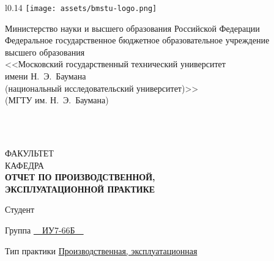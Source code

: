 \begin{titlepage}
	{
		\centering
		\begin{wrapfigure}[7]{l}{0.14\linewidth}
			\vspace{3.4mm}
			\hspace{-8mm}
			\texttt{[image: assets/bmstu-logo.png]}
		\end{wrapfigure}
		
		{
			\singlespacing \small
			Министерство науки и высшего образования Российской Федерации \\
			Федеральное государственное бюджетное образовательное учреждение \\
			высшего образования \\
			<<Московский государственный технический университет \\
			имени Н.~Э.~Баумана \\
			(национальный исследовательский университет)>> \\
			(МГТУ им. Н.~Э.~Баумана) \\
		}
		
		\vspace{-4.2mm}
		\vhrulefill{0.7mm} \\
		\vspace{-7mm}
		\vhrulefill{0.2mm} \\
		\vspace{2.8mm}
		
		\small
		ФАКУЛЬТЕТ  \\
		\vspace{3.3mm}
		КАФЕДРА  \\
		
		\vspace{15.8mm}
		\Large \bfseries
		ОТЧЕТ ПО ПРОИЗВОДСТВЕННОЙ,\\
		ЭКСПЛУАТАЦИОННОЙ ПРАКТИКЕ \\
	}
	
	\vspace{10.8mm}
	
	Студент \uline{\hfill{}\hfill}
	
	
	\vspace{3.3mm}
	
	Группа \uline{~~ИУ7-66Б~~}
	
	
	\vspace{1.3mm}
	
	
	Тип практики \uline{\hfill Производственная, эксплуатационная \hfill} 
	

\end{titlepage}
